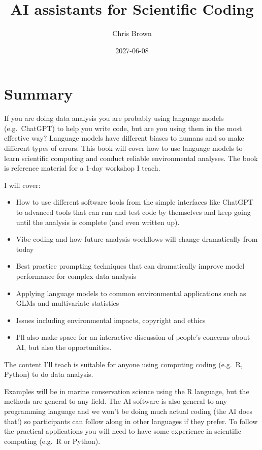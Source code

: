 \documentclass[
  letterpaper,
  DIV=11,
  numbers=noendperiod]{scrreprt}
\title{AI assistants for Scientific Coding}
\author{Chris Brown}
\date{2027-06-08}
\renewcommand*\contentsname{Table of contents}
\newcommand\contentsname{Table of contents}
\begin{document}
\maketitle

\renewcommand*\contentsname{Table of contents}
{
\hypersetup{linkcolor=}
\setcounter{tocdepth}{2}
\tableofcontents
}


\chapter{Summary}\label{summary}

If you are doing data analysis you are probably using language models
(e.g.~ChatGPT) to help you write code, but are you using them in the
most effective way? Language models have different biases to humans and
so make different types of errors. This book will cover how to use
language models to learn scientific computing and conduct reliable
environmental analyses. The book is reference material for a 1-day
workshop I teach.

I will cover:

\begin{itemize}
\item
  How to use different software tools from the simple interfaces like
  ChatGPT to advanced tools that can run and test code by themselves and
  keep going until the analysis is complete (and even written up).
\item
  Vibe coding and how future analysis workflows will change dramatically
  from today
\item
  Best practice prompting techniques that can dramatically improve model
  performance for complex data analysis
\item
  Applying language models to common environmental applications such as
  GLMs and multivariate statistics
\item
  Issues including environmental impacts, copyright and ethics
\item
  I'll also make space for an interactive discussion of people's
  concerns about AI, but also the opportunities.
\end{itemize}

The content I'll teach is suitable for anyone using computing coding
(e.g.~R, Python) to do data analysis.

Examples will be in marine conservation science using the R language,
but the methods are general to any field. The AI software is also
general to any programming language and we won't be doing much actual
coding (the AI does that!) so participants can follow along in other
languages if they prefer. To follow the practical applications you will
need to have some experience in scientific computing (e.g.~R or Python).
\end{document}
